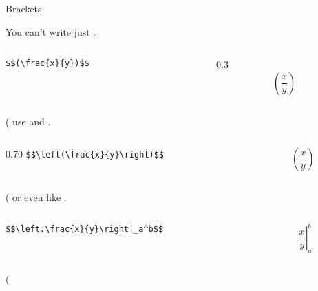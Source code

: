 \begin{frame}[fragile]{Brackets}\relax

You can't write just
\vphantom. 
    \begin{columns}
        \begin{column}{0.70\textwidth}
          \hfill \lstinline[basicstyle=\tt\normalsize]"$$(\frac{x}{y})$$" 
        \end{column}
        \begin{column}{0.3\textwidth}
             $$(\frac{x}{y})$$
        \end{column}
    \end{columns}
    \vphantom(
    \inpause
use \ccol{\left} and \ccol{\right}
     \vphantom. 
    \begin{columns}
        \begin{column}{0.70\textwidth}
          \hfill \lstinline[basicstyle=\tt\normalsize]"$$\left(\frac{x}{y}\right)$$" 
        \end{column}
        \begin{column}{0.3\textwidth}
             $$\left(\frac{x}{y}\right)$$
        \end{column}
    \end{columns}
    \vphantom(
    \inpause
or even like 
\vphantom. 
    \begin{columns}
        \begin{column}{0.70\textwidth}
          \hfill \lstinline[basicstyle=\tt\normalsize]"$$\left.\frac{x}{y}\right|_a^b$$" 
        \end{column}
        \begin{column}{0.3\textwidth}
             $$\left.\frac{x}{y}\right|_a^b$$
        \end{column}
    \end{columns}
    \vphantom(
\end{frame}

